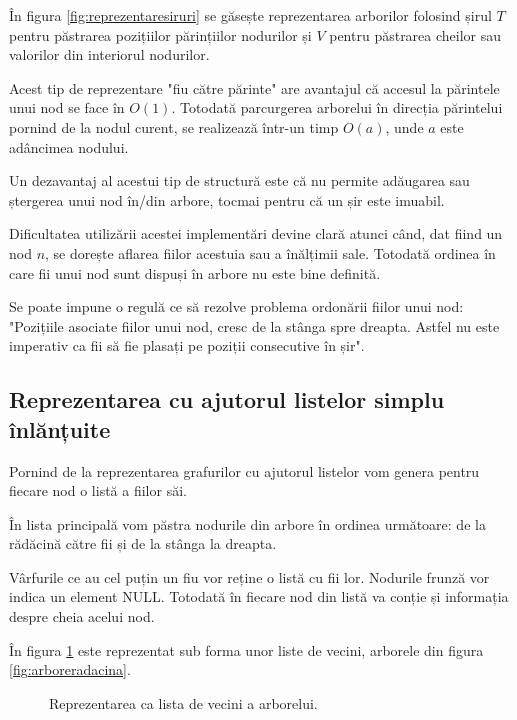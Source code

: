 În figura \ref{fig:reprezentaresiruri} se găsește reprezentarea arborilor folosind șirul $T$ pentru păstrarea pozițiilor părințiilor nodurilor și $V$ pentru păstrarea cheilor sau valorilor din interiorul nodurilor. 

Acest tip de reprezentare "fiu către părinte" are avantajul că accesul la părintele unui nod se face în $O(1)$. Totodată parcurgerea arborelui în direcția părintelui pornind de la nodul curent, se realizează într-un timp $O(a)$, unde $a$ este adâncimea nodului.

Un dezavantaj al acestui tip de structură este că nu permite adăugarea sau ștergerea unui nod în/din arbore, tocmai pentru că un șir este imuabil.

Dificultatea utilizării acestei implementări devine clară atunci când, dat fiind un nod $n$, se dorește aflarea fiilor acestuia sau a înălțimii sale. Totodată ordinea în care fii unui nod sunt dispuși în arbore nu este bine definită.

Se poate impune o regulă ce să rezolve problema ordonării fiilor unui nod: "Pozițiile asociate fiilor unui nod, cresc de la stânga spre dreapta. Astfel nu este imperativ ca fii să fie plasați pe poziții consecutive în șir".

\subsection{Reprezentarea cu ajutorul listelor simplu înlănțuite}

Pornind de la reprezentarea grafurilor cu ajutorul listelor vom genera pentru fiecare nod o listă a fiilor săi.

În lista principală vom păstra nodurile din arbore în ordinea următoare: de la rădăcină către fii și de la stânga la dreapta.

Vârfurile ce au cel puțin un fiu vor reține o listă cu fii lor. Nodurile frunză vor indica un element NULL. Totodată în fiecare nod din listă va conție și informația despre cheia acelui nod.

În figura \ref{fig:reprezentaresiruriliste} este reprezentat sub forma unor liste de vecini, arborele din figura \ref{fig:arboreradacina}.


\begin{figure}[H] 
	\centering	
	{
	}
	\caption{Reprezentarea ca lista de vecini a arborelui.} 
	\label{fig:reprezentaresiruriliste}
\end{figure}

